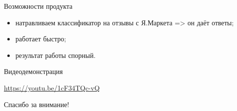 \documentclass[mathserif,utf8,14pt]{beamer}
\begin{document}
\begin{frame}{Возможности продукта}
    \begin{itemize}
        \item натравливаем классификатор на отзывы с Я.Маркета => он даёт ответы;
        \item работает быстро;
        \item результат работы спорный.
    \end{itemize}
\end{frame}

\begin{frame}{Видеодемонстрация}
    \begin{center}
        \url{https://youtu.be/1cF34TQc-vQ}
    \end{center}
\end{frame}
 
\begin{frame}{}
     \addtocounter{framenumber}{-1}
    \begin{center}
    \large Спасибо за внимание!
    \end{center}
\end{frame}
\end{document}

